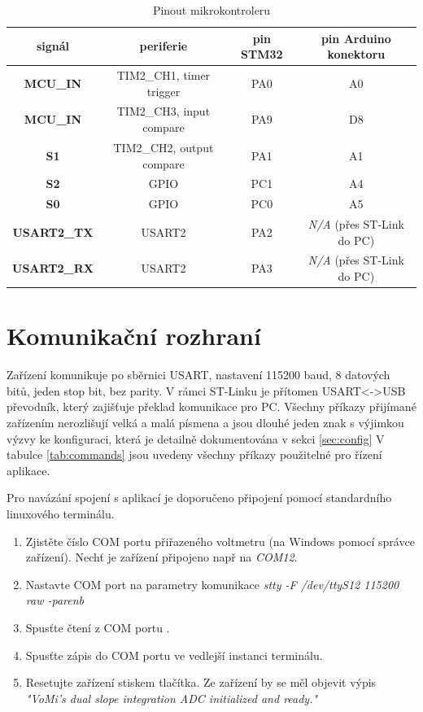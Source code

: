\documentclass[twoside]{article}
\begin{document}
\begin{table}[htbp]
    \centering
    \begin{tabular}{c|c|c|c}
        signál & periferie & pin STM32 & pin Arduino konektoru \\ \hline 
        \textbf{MCU\_IN} & TIM2\_CH1, timer trigger & PA0 & A0 \\
        \textbf{MCU\_IN} & TIM2\_CH3, input compare & PA9 & D8 \\
        \textbf{S1} & TIM2\_CH2, output compare & PA1 & A1 \\
        \textbf{S2} & GPIO & PC1 & A4 \\
        \textbf{S0} & GPIO & PC0 & A5 \\
        \textbf{USART2\_TX} & USART2 & PA2 & \textit{N/A} (přes ST-Link do PC)\\
        \textbf{USART2\_RX} & USART2 & PA3 & \textit{N/A} (přes ST-Link do PC)
    \end{tabular}
    \caption{Pinout mikrokontroleru}
    \label{table:pinout}
\end{table}


\section{Komunikační rozhraní}

Zařízení komunikuje po sběrnici USART, nastavení 115200 baud, 8 datových bitů, jeden stop bit,
bez parity. V rámci ST-Linku je přítomen USART<->USB převodník, který zajišťuje překlad komunikace pro PC.
Všechny příkazy přijímané zařízením nerozlišují velká a malá písmena a jsou dlouhé jeden znak
s výjimkou výzvy ke konfiguraci, která je detailně dokumentována v sekci \ref{sec:config}
V tabulce \ref{tab:commands} jsou uvedeny všechny příkazy použitelné pro řízení aplikace.

Pro navázání spojení s aplikací je doporučeno připojení pomocí standardního linuxového terminálu.
\begin{enumerate}
    \item Zjistěte číslo COM portu přiřazeného voltmetru (na Windows pomocí správce zařízení). Nechť je zařízení připojeno např na \textit{COM12}.
    \item Nastavte COM port na parametry komunikace \textit{stty -F /dev/ttyS12 115200 raw -parenb}
    \item Spusťte čtení z COM portu .
    \item Spusťte zápis do COM portu  ve vedlejší instanci terminálu.
    \item Resetujte zařízení stiskem tlačítka. Ze zařízení by se měl objevit výpis \textit{"VoMi's dual slope integration ADC initialized and ready."}
\end{enumerate}
\end{document}
